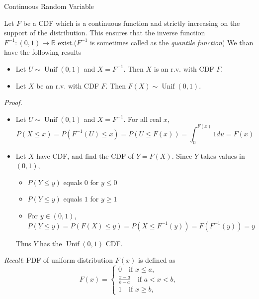 \documentclass[8pt]{beamer}
\newcommand{\myunif}[2]{\operatorname{Unif}\!\left(#1, #2\right)}
\begin{document}
\begin{frame}{Continuous Random Variable}
    \begin{theorem}
        Let $F$ be a CDF which is a continuous function and strictly increasing on the support of the distribution. This ensures that the inverse function $F^{-1}: (0,1) \mapsto \mathbb{R}$ exist.($F^{-1}$ is sometimes called as the \textit{quantile function}) We than have the following results
        \begin{itemize}
            \item Let $U \sim \myunif{0}{1}$ and $X = F^{-1}$. Then $X$ is an r.v. with CDF $F$.
            \item Let $X$ be an r.v. with CDF $F$. Then $F(X) \sim \myunif{0}{1}$.
        \end{itemize}
    \end{theorem}

    \textit{Proof.}
    \begin{itemize}
        \item Let $U \sim \myunif{0}{1}$ and $X = F^{-1}$. For all real $x$,
         \[P(X \leq x) = P(F^{-1}(U)\leq x) = P(U \leq F(x)) = \int_0^{F(x)} 1 du =F(x)\]
        \item Let $X$ have CDF, and find the CDF of $Y = F(X)$. Since $Y$ takes values in $(0,1)$, 
        \begin{itemize}
            \item $P(Y\leq y)$ equals $0$ for $y \leq 0$
            \item $P(Y\leq y)$ equals $1$ for $y \geq 1$
            \item For $y \in (0,1)$, $P(Y \leq y) = P(F(X) \leq y) = P(X \leq F^{-1}(y)) = F(F^{-1}(y)) = y$
        \end{itemize}
        Thus $Y$ has the $\myunif{0}{1}$ CDF.
    \end{itemize}
    \textit{Recall}: PDF of uniform distribution $F(x)$ is defined as
    \[
        F(x) = \begin{cases}
            0 \quad \text{if } x\leq a,
            \\ \frac{x-a}{b-a} \quad \text{if } a < x <b,
            \\ 1 \quad \text{if } x \geq b,
        \end{cases}
    \]

\end{frame}
\end{document}
